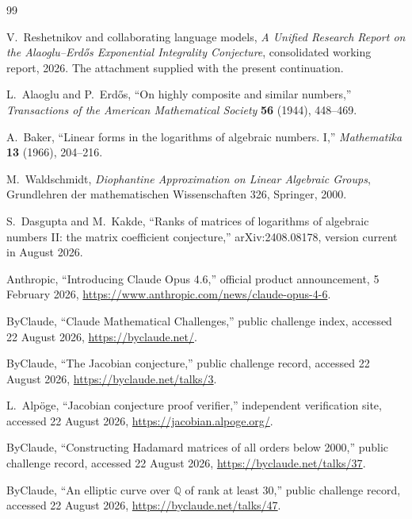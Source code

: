 \documentclass[11pt,oneside]{article}
\theoremstyle{research}
\theoremstyle{definition}
\newcommand{\Q}{\mathbb Q}
\begin{document}
\begin{thebibliography}{99}

V.~Reshetnikov and collaborating language models,
\emph{A Unified Research Report on the Alaoglu--Erdős Exponential
Integrality Conjecture}, consolidated working report, 2026.
The attachment supplied with the present continuation.

L.~Alaoglu and P.~Erdős,
``On highly composite and similar numbers,''
\emph{Transactions of the American Mathematical Society}
\textbf{56} (1944), 448--469.

A.~Baker,
``Linear forms in the logarithms of algebraic numbers. I,''
\emph{Mathematika} \textbf{13} (1966), 204--216.

M.~Waldschmidt,
\emph{Diophantine Approximation on Linear Algebraic Groups},
Grundlehren der mathematischen Wissenschaften 326,
Springer, 2000.

S.~Dasgupta and M.~Kakde,
``Ranks of matrices of logarithms of algebraic numbers II:
the matrix coefficient conjecture,''
arXiv:2408.08178, version current in August 2026.

Anthropic,
``Introducing Claude Opus 4.6,'' official product announcement,
5 February 2026,
\url{https://www.anthropic.com/news/claude-opus-4-6}.

ByClaude,
``Claude Mathematical Challenges,'' public challenge index,
accessed 22 August 2026,
\url{https://byclaude.net/}.

ByClaude,
``The Jacobian conjecture,'' public challenge record,
accessed 22 August 2026,
\url{https://byclaude.net/talks/3}.

L.~Alp\"oge,
``Jacobian conjecture proof verifier,'' independent verification site,
accessed 22 August 2026,
\url{https://jacobian.alpoge.org/}.

ByClaude,
``Constructing Hadamard matrices of all orders below 2000,''
public challenge record, accessed 22 August 2026,
\url{https://byclaude.net/talks/37}.

ByClaude,
``An elliptic curve over $\Q$ of rank at least 30,''
public challenge record, accessed 22 August 2026,
\url{https://byclaude.net/talks/47}.

\end{thebibliography}
\end{document}

